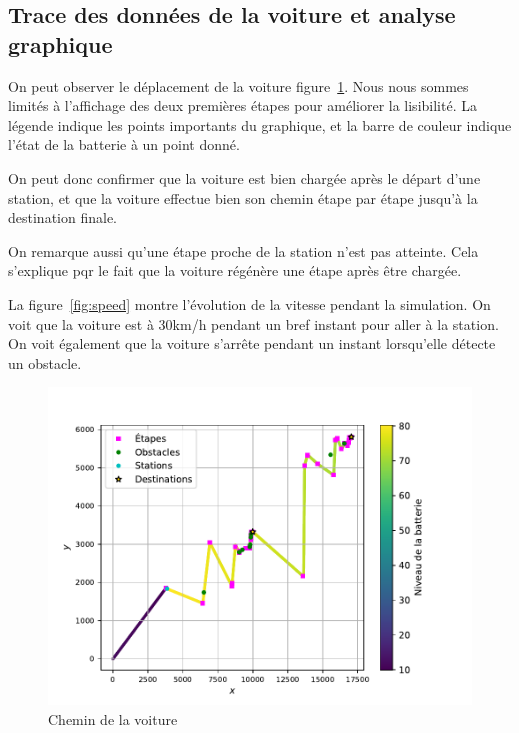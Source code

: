 \documentclass[conference]{IEEEtran}
\begin{document}
\subsection{Trace des données de la voiture et analyse graphique}

On peut observer le déplacement de la voiture figure~\ref{fig:path}. Nous nous sommes
limités à l'affichage des deux premières étapes pour améliorer la lisibilité. La légende
indique les points importants du graphique, et la barre de couleur indique l'état de la
batterie à un point donné.

On peut donc confirmer que la voiture est bien chargée après le départ d'une station, et
que la voiture effectue bien son chemin étape par étape jusqu'à la destination finale.

On remarque aussi qu'une étape proche de la station n'est pas atteinte. Cela s'explique
pqr le fait que la voiture régénère une étape après être chargée.

La figure~\ref{fig:speed} montre l'évolution de la vitesse pendant la simulation. On voit
que la voiture est à 30km/h pendant un bref instant pour aller à la station. On voit
également que la voiture s'arrête pendant un instant lorsqu'elle détecte un obstacle.

\begin{figure}[h]
    \centering
    \includegraphics[width=1.1\linewidth]{path.pdf}  
    \caption{Chemin de la voiture}
    \label{fig:path}
\end{figure}
\end{document}
